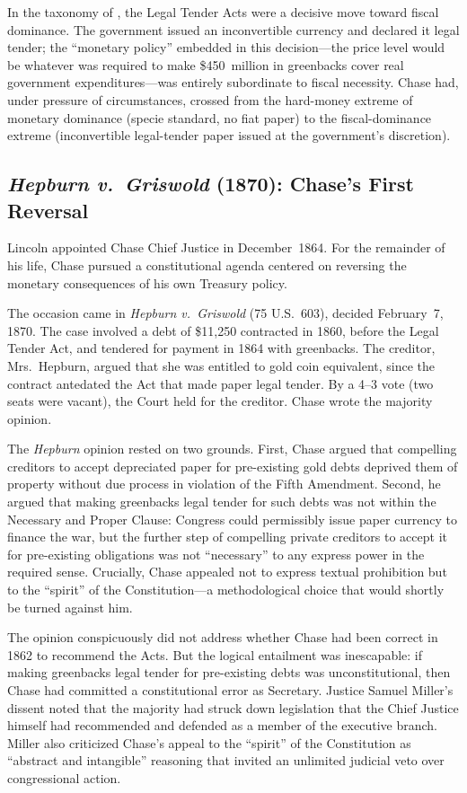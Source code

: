\documentclass[12pt]{article}
\begin{document}
In the taxonomy of \citet{Sargent2011}, the Legal Tender Acts were a
decisive move toward fiscal dominance.  The government issued an
inconvertible currency and declared it legal tender; the ``monetary
policy'' embedded in this decision---the price level would be whatever
was required to make \$450~million in greenbacks cover real government
expenditures---was entirely subordinate to fiscal necessity.  Chase had,
under pressure of circumstances, crossed from the hard-money extreme of
monetary dominance (specie standard, no fiat paper) to the
fiscal-dominance extreme (inconvertible legal-tender paper issued at the
government's discretion).

\subsection{\textit{Hepburn v.\ Griswold} (1870): Chase's First
             Reversal}

Lincoln appointed Chase Chief Justice in December~1864.  For the
remainder of his life, Chase pursued a constitutional agenda centered on
reversing the monetary consequences of his own Treasury policy.

The occasion came in \textit{Hepburn v.\ Griswold} (75 U.S.\ 603),
decided February~7, 1870.  The case involved a debt of \$11,250
contracted in 1860, before the Legal Tender Act, and tendered for
payment in 1864 with greenbacks.  The creditor, Mrs.\ Hepburn, argued
that she was entitled to gold coin equivalent, since the contract
antedated the Act that made paper legal tender.  By a 4--3 vote (two
seats were vacant), the Court held for the creditor.  Chase wrote the
majority opinion.

The \textit{Hepburn} opinion rested on two grounds.  First, Chase argued
that compelling creditors to accept depreciated paper for pre-existing
gold debts deprived them of property without due process in violation
of the Fifth Amendment.  Second, he argued that making greenbacks legal
tender for such debts was not within the Necessary and Proper Clause:
Congress could permissibly issue paper currency to finance the war, but
the further step of compelling private creditors to accept it for
pre-existing obligations was not ``necessary'' to any express power in
the required sense.  Crucially, Chase appealed not to express textual
prohibition but to the ``spirit'' of the Constitution---a methodological
choice that would shortly be turned against him.

The opinion conspicuously did not address whether Chase had been correct
in 1862 to recommend the Acts.  But the logical entailment was
inescapable: if making greenbacks legal tender for pre-existing debts
was unconstitutional, then Chase had committed a constitutional error as
Secretary.  Justice Samuel Miller's dissent noted that the majority had struck down legislation that the
Chief Justice himself had recommended and defended as a member of the
executive branch.  Miller also criticized Chase's appeal to the
``spirit'' of the Constitution as ``abstract and intangible'' reasoning
that invited an unlimited judicial veto over congressional action.
\end{document}

